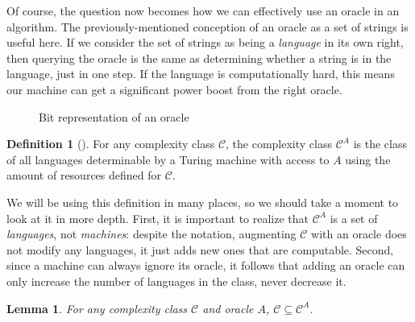 \documentclass[english,12pt]{reedthesis}
\theoremstyle{plain}
\newtheorem{lemma}[lemma]{Lemma}
\theoremstyle{definition}
\newtheorem{defn}[defn]{Definition}
\theoremstyle{remark}
\begin{document}
Of course, the question now becomes how we can effectively use an oracle in an
algorithm. The previously-mentioned conception of an oracle as a set of strings
is useful here. If we consider the set of strings as being a \emph{language} in
its own right, then querying the oracle is the same as determining whether a
string is in the language, just in one step. If the language is computationally
hard, this means our machine can get a significant power boost from the right
oracle.

\begin{figure}[htbp]
  \centering
  \caption{Bit representation of an oracle}\label{fig:oracle-bits}
\end{figure}

\begin{defn}[{\cite[Def.\ 2.1]{AW09}}]\label{def:oracle-class}
  For any complexity class $\mathcal{C}$, the complexity class $\mathcal{C}^{A}$ is the class of all
  languages determinable by a Turing machine with access to $A$ using the amount
  of resources defined for $\mathcal{C}$.
\end{defn}

We will be using this definition in many places, so we should take a moment to
look at it in more depth. First, it is important to realize that $\mathcal{C}^{A}$ is a
set of \emph{languages}, not \emph{machines}: despite the notation, augmenting
$\mathcal{C}$ with an oracle does not modify any languages, it just adds new ones that are
computable. Second, since a machine can always ignore its oracle, it follows
that adding an oracle can only increase the number of languages in the class,
never decrease it.

\begin{lemma}\label{thm:relativizing-increases}
  For any complexity class $\mathcal{C}$ and oracle $A$, $\mathcal{C} \subseteq \mathcal{C}^{A}$.
\end{lemma}
\end{document}
